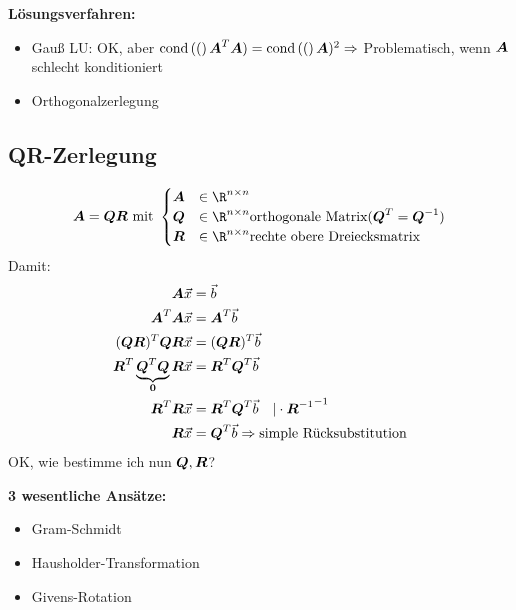 \textbf{Lösungsverfahren:}
\begin{itemize}
\item Gauß LU: OK, aber $\text{cond}\left((\right)\boldsymbol {A}^T\boldsymbol {A}) = \text{cond}\left((\right)\boldsymbol {A})^2\Rightarrow$ Problematisch, wenn $\boldsymbol {A}$ schlecht konditioniert
\item Orthogonalzerlegung
\end{itemize}

\subsection{QR-Zerlegung}
\[\ma A = \ma Q\ma R \text{ mit }\begin{cases}
\ma A & \in \R^{n\times n}\\
\ma Q & \in \R^{n\times n} \text{orthogonale Matrix} (\ma Q^T = \ma Q^{-1})\\
\ma R & \in \R^{n\times n} \text{rechte obere Dreiecksmatrix}
\end{cases}\]
Damit:
\begin{equation}
\begin{split}
\boldsymbol {A}\vec x &= \vec b\\
\boldsymbol {A}^T\boldsymbol {A}\vec x &= \boldsymbol {A}^T\vec b\\
(\boldsymbol {Q}\boldsymbol {R})^T\boldsymbol {Q}\boldsymbol {R}\vec x &= (\boldsymbol {Q}\boldsymbol {R})^T\vec b\\
\boldsymbol {R}^T\underbrace{\boldsymbol {Q}^T\boldsymbol {Q}}_{\boldsymbol {0}}\boldsymbol {R}\vec x &= \boldsymbol {R}^T\boldsymbol {Q}^T\vec b\\
\boldsymbol {R}^T\boldsymbol {R}\vec x &= \boldsymbol {R}^T\boldsymbol {Q}^T\vec b\quad\vert\cdot{\ensuremath{\boldsymbol {R}}^{-1}}^{-1}\\
\boldsymbol {R}\vec x &= \boldsymbol {Q}^T\vec b\Rightarrow \text{simple Rücksubstitution}
\end{split}
\end{equation}
OK, wie bestimme ich nun $\boldsymbol {Q},\boldsymbol {R}$?

\textbf{3 wesentliche Ansätze:}
\begin{itemize}
\item Gram-Schmidt
\item Hausholder-Transformation
\item Givens-Rotation
\end{itemize}

